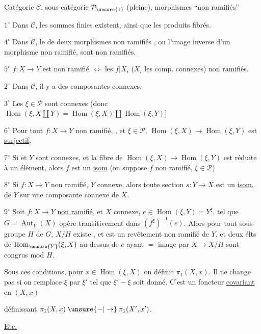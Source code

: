 Catégorie $\mathcal C$, sous-catégorie $\mathcal P_{\unsure{1}}$ (pleine), morphismes ``non ramifiés''

\uline{$1^\circ$} Dans $\mathcal C$, les sommes finies existent, ainsi que les produits fibrés.

\uline{$4^\circ$} Dans $\mathcal C$, le  de deux morphismes non ramifiés , ou l'image inverse d'un morphisme non ramifié, sont non ramifiés.

\uline{$5^\circ$}  $f:X\to Y$ est non ramifié $\Longleftrightarrow$ les $f|X_i$ ($X_i$ les comp. connexes)  non ramifiés.

\uline{$2^\circ$} Dans $\mathcal C$, il y a des composantes connexes.

\uline{$3^\circ$} Les  $\xi\in\mathcal P$ sont connexes
(donc $\operatorname{Hom}(\xi,X\amalg Y)=\operatorname{Hom}(\xi,X)\amalg\operatorname{Hom}(\xi,Y)$]

\uline{$6^\circ$} Pour tout $f:X\to Y$ non ramifié, , et $\xi\in\mathcal P$,
$\operatorname{Hom}(\xi,X)\to\operatorname{Hom}(\xi,Y)$ est \uline{surjectif}.

\uline{$7^\circ$} Si  et $Y$ sont connexes, et la fibre de
$\operatorname{Hom}(\xi,X)\to\operatorname{Hom}(\xi,Y)$ est réduite à un élément, alors $f$ est un \uline{isom}
(on suppose $f$ non ramifié, $\xi\in\mathcal P$)

\uline{$8^\circ$} Si $f:X\to Y$ non ramifié, $Y$ connexe, alors  toute  section $s:Y\to X$ est un \uline{isom.} de $Y$ sur une composante connexe de $X$.

\uline{$9^\circ$} Soit 
$f:X\to Y$ \uline{non ramifié}, et $X$ connexe, \unsure{$\xi\in$} $e\in\operatorname{Hom}(\xi,Y)=Y^\xi$, tel que $G=\operatorname{Aut}_Y(X)$ opère transitivement dans $(f^\xi)^{-1}(e)$.
Alors pour tout sous-groupe $H$ de $G$, $X/H$ existe , et est un revêtement non ramifié de $Y$.
et deux élts de $\operatorname{Hom}_{\unsure{Y}}(\xi,X)$ au-dessus de $e$ ayant $=$ image par $X\to X/H$ sont congrus mod $H$.

Sous ces conditions, pour $x\in\operatorname{Hom}(\xi,X)$ on définit $\pi_1(X,x)$.
Il ne change pas si on remplace $\xi$ par $\xi'$ tel que $\xi'-\xi$ soit donné.
C'est un foncteur \uline{covariant} en $(X,x)$

définissant $\pi_1(X,x)\mathbin{\unsure{-|\to}}\pi_1(X',x')$.

\uline{Etc.}
